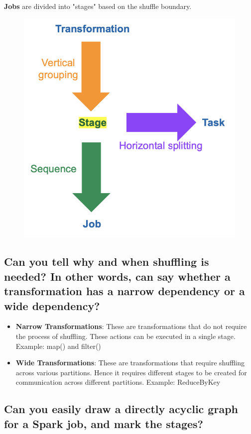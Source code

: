 \documentclass{article}
\begin{document}
\textbf{Jobs} are divided into "stages" based on the shuffle boundary.

\begin{figure}[H]
    \centering
    \includegraphics[width=0.5\linewidth]{img/spark_terminology.png}
\end{figure}

\subsection{Can you tell why and when shuffling is needed? In other words, can say whether a transformation has a narrow dependency or a wide dependency?}

\begin{itemize}
    \item \textbf{Narrow Transformations}: These are transformations that do not require the process of shuffling. These actions can be executed in a single stage. Example: map() and filter()
    \item \textbf{Wide Transformations}: These are transformations that require shuffling across various partitions. Hence it requires different stages to be created for communication across different partitions. Example: ReduceByKey
\end{itemize}

\subsection{Can you easily draw a directly acyclic graph for a Spark job, and mark the stages?}
\end{document}
